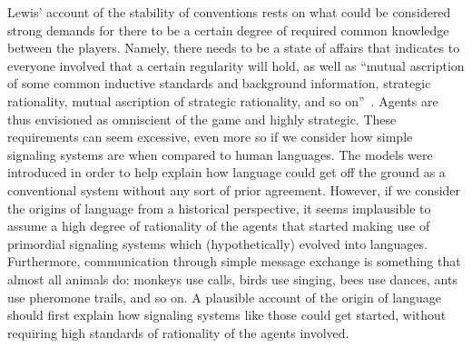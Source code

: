 \documentclass[a4paper]{article}
\begin{document}
Lewis' account of the stability of conventions rests on what could be considered strong demands for there to be a certain degree of required common knowledge between the players.
Namely, there needs to be a state of affairs that indicates to everyone involved that a certain regularity will hold, as well as ``mutual ascription of some common inductive standards and background information, strategic rationality, mutual ascription of strategic rationality, and so on''~\parencite*[56--57]{lewis_convention_1969}.
Agents are thus envisioned as omniscient of the game and highly strategic.
These requirements can seem excessive, even more so if we consider how simple signaling systems are when compared to human languages.
The models were introduced in order to help explain how language could get off the ground as a conventional system without any sort of prior agreement.
However, if we consider the origins of language from a historical perspective, it seems implausible to assume a high degree of rationality of the agents that started making use of primordial signaling systems which (hypothetically) evolved into languages.
Furthermore, communication through simple message exchange is something that almost all animals do: monkeys use calls, birds use singing, bees use dances, ants use pheromone trails, and so on.
A plausible account of the origin of language should first explain how signaling systems like those could get started, without requiring high standards of rationality of the agents involved.
\end{document}
